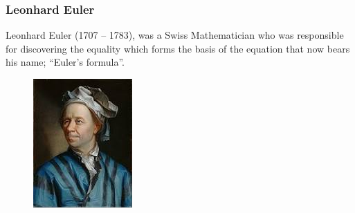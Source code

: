 \begin{frame}[t]

	\frametitle{Leonhard Euler}

	Leonhard Euler (1707 -- 1783), was a Swiss Mathematician who was responsible for discovering
	the equality which forms the basis of the equation that now bears his name; ``Euler's formula''.

	\begin{figure}
	  \includegraphics[scale=0.625]{./images/png/Leonhard_Euler.png}
	\end{figure}

\end{frame}
